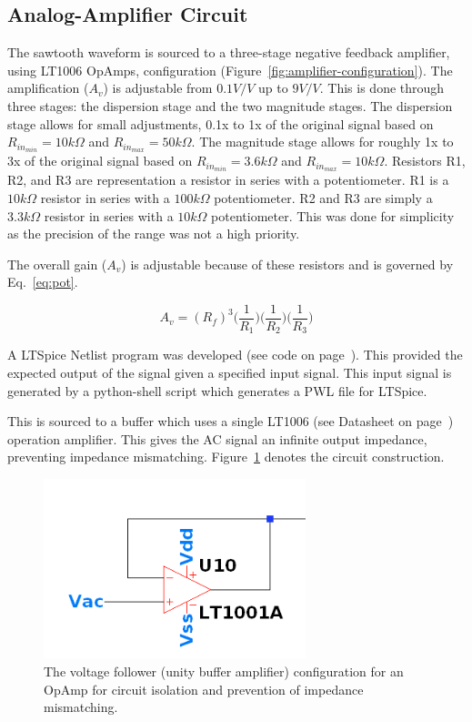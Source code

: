 \documentclass[12pt,journal]{IEEEtran}
\begin{document}
\subsection{Analog-Amplifier Circuit}

The sawtooth waveform is sourced to a three-stage negative feedback amplifier, using LT1006 OpAmps, configuration (Figure~\ref{fig:amplifier-configuration}). The amplification ($A_v$) is adjustable from $0.1 V/V$ up to $9 V/V$. This is done through three stages: the dispersion stage and the two magnitude stages. The dispersion stage allows for small adjustments, 0.1x to 1x of the original signal based on $R_{in_{min}} = 10k\Omega$ and $R_{in_{max}} = 50k\Omega$. The magnitude stage allows for roughly 1x to 3x of the original signal based on  $R_{in_{min}} = 3.6k\Omega$ and $R_{in_{max}} = 10k\Omega$. Resistors R1, R2, and R3 are representation a resistor in series with a potentiometer. R1 is a $10k\Omega$ resistor in series with a $100k\Omega$ potentiometer. R2 and R3 are simply a $3.3k\Omega$ resistor in series with a $10k\Omega$ potentiometer. This was done for simplicity as the precision of the range was not a high priority. 

The overall gain ($A_v$) is adjustable because of these resistors and is governed by Eq.~\ref{eq:pot}.

\begin{equation}
A_v = (R_f)^3\Big(\frac{1}{R_1}\Big)\Big(\frac{1}{R_2}\Big)\Big(\frac{1}{R_3}\Big)
\label{eq:pot}
\end{equation}

A LTSpice Netlist program was developed (see code on page~\pageref{software:ltspice}). This provided the expected output of the signal given a specified input signal. This input signal is generated by a python-shell script which generates a PWL file for LTSpice.

This is sourced to a buffer which uses a single LT1006 (see Datasheet on page~\pageref{datasheet:lt1006}) operation amplifier. This gives the AC signal an infinite output impedance, preventing impedance mismatching. Figure~\ref{fig:buffer} denotes the circuit construction.

\begin{figure}[h!]
  \centering
	\includegraphics[width=3in]{./ltspice/unity-buffer-ltspice.png}
	\caption{The voltage follower (unity buffer amplifier) configuration for an OpAmp for circuit isolation and prevention of impedance mismatching.}
	\label{fig:buffer}
\end{figure}  
\end{document}
